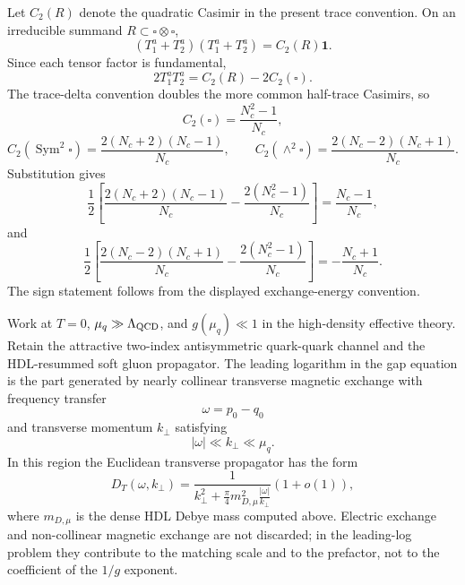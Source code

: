 Let \(C_2(R)\) denote the quadratic Casimir in the present trace convention.
On an irreducible summand \(R\subset\square\otimes\square\),
\[
  (T_1^a+T_2^a)(T_1^a+T_2^a)=C_2(R)\mathbf 1 .
\]
Since each tensor factor is fundamental,
\[
  2T_1^aT_2^a=C_2(R)-2C_2(\square).
\]
The trace-delta convention doubles the more common half-trace Casimirs, so
\[
  C_2(\square)=\frac{N_c^2-1}{N_c},
\]
\[
  C_2(\operatorname{Sym}^2\square)
  =
  \frac{2(N_c+2)(N_c-1)}{N_c},
  \qquad
  C_2(\wedge^2\square)
  =
  \frac{2(N_c-2)(N_c+1)}{N_c}.
\]
Substitution gives
\[
  \frac12\left[
    \frac{2(N_c+2)(N_c-1)}{N_c}
    -\frac{2(N_c^2-1)}{N_c}
  \right]
  =
  \frac{N_c-1}{N_c},
\]
and
\[
  \frac12\left[
    \frac{2(N_c-2)(N_c+1)}{N_c}
    -\frac{2(N_c^2-1)}{N_c}
  \right]
  =
  -\frac{N_c+1}{N_c}.
\]
The sign statement follows from the displayed exchange-energy convention.

\begin{controlledapproximation}
\label{ca:qcd-leading-log-magnetic-gap}
Work at \(T=0\), \(\mu_q\gg\Lambda_{\rm QCD}\), and
\(g(\mu_q)\ll1\) in the high-density effective theory.  Retain the
attractive two-index antisymmetric quark-quark channel and the HDL-resummed
soft gluon propagator.  The leading logarithm in the gap equation is the
part generated by nearly collinear transverse magnetic exchange with
frequency transfer
\[
  \omega=p_0-q_0
\]
and transverse momentum \(k_\perp\) satisfying
\[
  |\omega|\ll k_\perp\ll \mu_q .
\]
In this region the Euclidean transverse propagator has the form
\begin{equation}
  D_T(\omega,k_\perp)
  =
  \frac{1}{
    k_\perp^2
    +\frac{\pi}{4}m_{D,\mu}^2\frac{|\omega|}{k_\perp}
  }
  \left(1+o(1)\right),
  \label{eq:qcd-hdl-transverse-landau-damped}
\end{equation}
where \(m_{D,\mu}\) is the dense HDL Debye mass computed above.  Electric exchange
and non-collinear magnetic exchange are not discarded; in the leading-log
problem they contribute to the matching scale and to the prefactor, not to
the coefficient of the \(1/g\) exponent.
\end{controlledapproximation}

